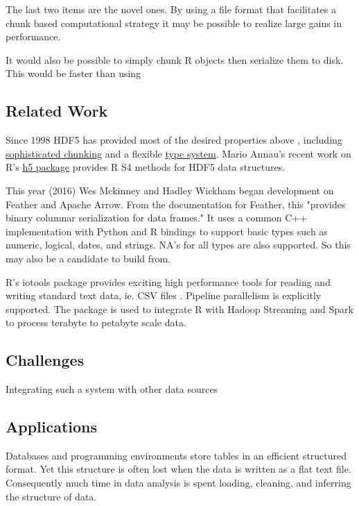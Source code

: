 \documentclass[12pt]{article}
\begin{document}
The last two items are the novel ones. By using a file format
that facilitates a chunk based computational strategy it may be possible to
realize large gains in performance.

It would also be possible to simply chunk R objects then serialize 
them to disk. This would be faster than using 

\subsection{Related Work}

Since 1998 HDF5 has provided most of the desired properties above
\cite{hdf5}, including
\href{https://support.hdfgroup.org/HDF5/doc/Advanced/Chunking/}{sophisticated
chunking} and a flexible
\href{https://support.hdfgroup.org/HDF5/doc1.6/UG/11_Datatypes.html}{type system}.
Mario Annau's recent work on R's \href{https://github.com/mannau/h5}{h5
package} provides R S4 methods for HDF5 data structures.

This year (2016) Wes Mckinney and Hadley Wickham began development on Feather and
Apache Arrow. From the documentation for Feather, this "provides binary columnar
serialization for data frames." It uses a common C++ implementation with
Python and R bindings to support basic types such as numeric, logical,
dates, and strings. NA's for all types are also supported. So this may also
be a candidate to build from.

R's iotools package provides exciting high performance tools for reading
and writing standard text data, ie. CSV files \cite{arnold2015iotools}.
Pipeline parallelism is explicitly supported. The package is used to
integrate R with Hadoop Streaming and Spark to process terabyte to petabyte
scale data.

\subsection{Challenges}

Integrating such a system with other data sources

\subsection{Applications}

Databases and programming environments store tables in an efficient
structured format. Yet this structure is often lost when the data is
written as a flat text file. Consequently much time in data analysis is
spent loading, cleaning, and inferring the structure of data.
\end{document}
